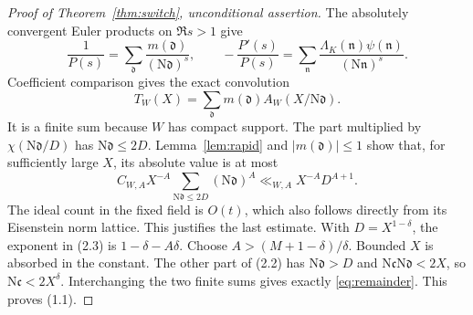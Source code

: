 \documentclass[11pt]{article}
\newcommand{\N}{\mathrm N}
\begin{document}
\begin{proof}[Proof of Theorem~\ref{thm:switch}, unconditional assertion]
The absolutely convergent Euler products on $\Re s>1$ give
\[
 \frac1{P(s)}=\sum_{\mathfrak d}
                  \frac{m(\mathfrak d)}{(\N\mathfrak d)^s},
 \qquad
 -\frac{P'(s)}{P(s)}
  =\sum_{\mathfrak n}
     \frac{\Lambda_K(\mathfrak n)\psi(\mathfrak n)}
          {(\N\mathfrak n)^s}.
\]
Coefficient comparison gives the exact convolution
\[
 T_W(X)=\sum_{\mathfrak d}m(\mathfrak d)
            A_W(X/\N\mathfrak d).
                                                               \tag{2.2}
\]
It is a finite sum because $W$ has compact support.
The part multiplied by $\chi(\N\mathfrak d/D)$ has
$\N\mathfrak d\le2D$. Lemma~\ref{lem:rapid} and
$|m(\mathfrak d)|\le1$ show that, for sufficiently large $X$,
its absolute value is at most
\[
 C_{W,A}X^{-A}
   \sum_{\N\mathfrak d\le2D}(\N\mathfrak d)^A
 \ll_{W,A}X^{-A}D^{A+1}.
                                                               \tag{2.3}
\]
The ideal count in the fixed field is $O(t)$, which also follows
directly from its Eisenstein norm lattice. This justifies the last
estimate. With $D=X^{1-\delta}$, the exponent in (2.3) is
$1-\delta-A\delta$. Choose
$A>(M+1-\delta)/\delta$. Bounded $X$ is absorbed in the constant.
The other part of (2.2) has $\N\mathfrak d>D$ and
$\N\mathfrak c\N\mathfrak d<2X$, so $\N\mathfrak c<2X^\delta$.
Interchanging the two finite sums gives exactly
\eqref{eq:remainder}. This proves (1.1).
\end{proof}
\end{document}
